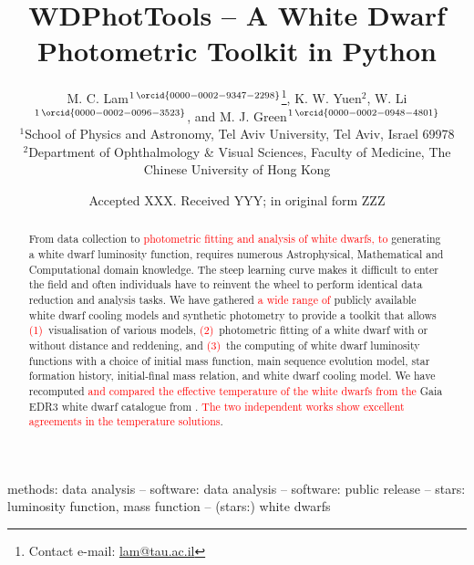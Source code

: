 \documentclass[fleqn,usenatbib]{rasti}
\title[WD Photometric Toolkit]{WDPhotTools -- A White Dwarf Photometric Toolkit in Python}
\author[M. C. Lam et al.]{
M. C. Lam$^{1\,\orcid{0000-0002-9347-2298}}$\thanks{Contact e-mail: \href{mailto:lam@tau.ac.il}{lam@tau.ac.il}},
K. W. Yuen$^{2}$,
W. Li$^{1\,\orcid{0000-0002-0096-3523}}$, and
M. J. Green$^{1\,\orcid{0000-0002-0948-4801}}$\\
$^{1}$School of Physics and Astronomy, Tel Aviv University, Tel Aviv, Israel 69978\\
$^{2}$Department of Ophthalmology \& Visual Sciences, Faculty of Medicine, The Chinese University of Hong Kong
}
\date{Accepted XXX. Received YYY; in original form ZZZ}
\begin{document}
\label{firstpage}
\pagerange{\pageref{firstpage}--\pageref{lastpage}}
\maketitle

\begin{abstract}
From data collection to \textcolor{red}{photometric fitting and analysis of
white dwarfs, to} generating a white dwarf luminosity function, requires
numerous Astrophysical, Mathematical and Computational domain knowledge. The
steep learning curve makes it difficult to enter the field and often
individuals have to reinvent the wheel to perform identical data reduction and
analysis tasks. We have gathered \textcolor{red}{a wide range of} publicly
available white dwarf cooling models and synthetic photometry to provide a
toolkit that allows \textcolor{red}{(1)}~visualisation of various models,
\textcolor{red}{(2)}~photometric fitting of a white dwarf with or without
distance and reddening, and \textcolor{red}{(3)}~the computing of white
dwarf luminosity functions with a choice of initial mass function, main
sequence evolution model, star formation history, initial-final mass relation,
and white dwarf cooling model. We have recomputed \textcolor{red}{and compared
the effective temperature of the white dwarfs from the} Gaia EDR3 white dwarf
catalogue from \citet{2021MNRAS.508.3877G}. \textcolor{red}{The two independent
works show excellent agreements in the temperature solutions}.
\end{abstract}

\begin{keywords}
methods: data analysis -- software: data analysis -- software: public release -- stars: luminosity function, mass function -- (stars:) white dwarfs
\end{keywords}

\end{document}
